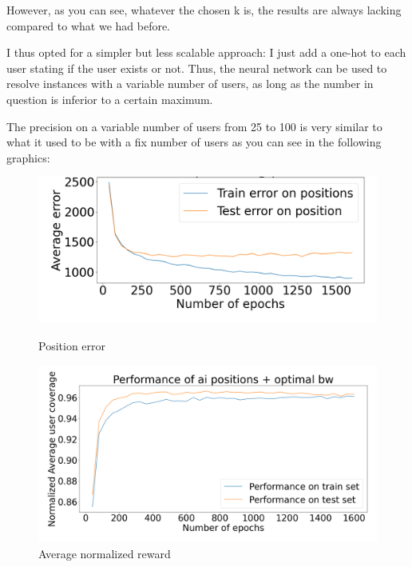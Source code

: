 \documentclass[letterpaper]{article}
\begin{document}
However, as you can see, whatever the chosen k is, the results are always lacking compared to what we had before.

I thus opted for a simpler but less scalable approach: I just add a one-hot to each user stating if the user exists or not.
Thus, the neural network can be used to resolve instances with a variable number of users, as long as the number in question is inferior to a certain maximum.

The precision on a variable number of users from 25 to 100 is very similar to what it used to be with a fix number of users as you can see in the following graphics:

\begin{figure}[H]
    \centering
    \begin{minipage}[b]{0.45\textwidth}
        \centering
        \includegraphics[width=\textwidth]{images/error_pos_variable_user_number.png}
        \caption{Position error}
    \end{minipage}
    \hspace{0.05\textwidth}
    \begin{minipage}[b]{0.45\textwidth}
        \centering
        \includegraphics[width=\textwidth]{images/reward_variable_user_number.png}
        \caption{Average normalized reward}
    \end{minipage}
\end{figure}
\end{document}
